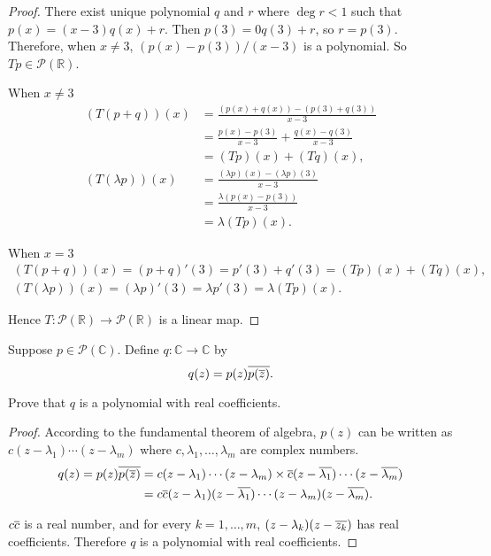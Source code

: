 \begin{proof}
    There exist unique polynomial $q$ and $r$ where $\deg r < 1$ such that $p(x) = (x - 3)q(x) + r$. Then $p(3) = 0q(3) + r$, so $r = p(3)$. Therefore, when $x\ne 3$, $(p(x) - p(3))/(x - 3)$ is a polynomial. So $Tp\in\mathscr{P}(\mathbb{R})$.

    When $x\ne 3$
    \begin{align*}
        (T(p + q))(x)     & = \frac{(p(x) + q(x)) - (p(3) + q(3))}{x - 3}           \\
                          & = \frac{p(x) - p(3)}{x - 3} + \frac{q(x) - q(3)}{x - 3} \\
                          & = (Tp)(x) + (Tq)(x),                                    \\
        (T(\lambda p))(x) & = \frac{(\lambda p)(x) - (\lambda p)(3)}{x - 3}         \\
                          & = \frac{\lambda (p(x) - p(3))}{x - 3}                   \\
                          & = \lambda (Tp)(x).
    \end{align*}

    When $x = 3$
    \[
        \begin{split}
            (T(p + q))(x) = (p + q)'(3) = p'(3) + q'(3) = (Tp)(x) + (Tq)(x), \\
            (T(\lambda p))(x) = (\lambda p)'(3) = \lambda p'(3) = \lambda (Tp)(x).
        \end{split}
    \]

    Hence $T: \mathscr{P}(\mathbb{R})\to \mathscr{P}(\mathbb{R})$ is a linear map.
\end{proof}
\newpage

\begin{exercise}
    Suppose $p\in\mathscr{P}(\mathbb{C})$. Define $q: \mathbb{C}\to \mathbb{C}$ by
    \[
        q(z) = p(z)\overline{p(\overline{z})}.
    \]

    Prove that $q$ is a polynomial with real coefficients.
\end{exercise}

\begin{proof}
    According to the fundamental theorem of algebra, $p(z)$ can be written as $c(z - \lambda_{1})\cdots (z - \lambda_{m})$ where $c, \lambda_{1}, \ldots, \lambda_{m}$ are complex numbers.
    \begin{align*}
        q(z) = p(z)\overline{p(\overline{z})} & = c(z - \lambda_{1})\cdots (z - \lambda_{m}) \times \overline{c}(z - \overline{\lambda_{1}})\cdots (z - \overline{\lambda_{m}}) \\
                                      & = c\overline{c}(z - \lambda_{1})(z - \overline{\lambda_{1}})\cdots (z - \lambda_{m})(z - \overline{\lambda_{m}}).
    \end{align*}

    $c\overline{c}$ is a real number, and for every $k = 1, \ldots, m$, $(z - \lambda_{k})(z - \overline{z_{k}})$ has real coefficients. Therefore $q$ is a polynomial with real coefficients.
\end{proof}
\newpage

